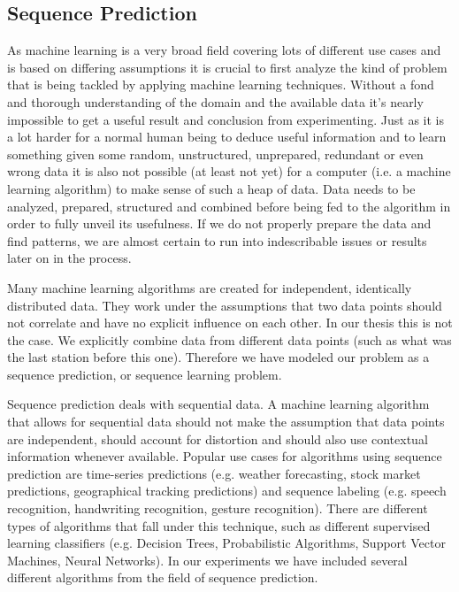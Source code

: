 \subsection{Sequence Prediction}
As machine learning is a very broad field covering lots of different use cases and is based on differing assumptions it is crucial to first analyze the kind of problem that is being tackled by applying machine learning techniques. Without a fond and thorough understanding of the domain and the available data it's nearly impossible to get a useful result and conclusion from experimenting. Just as it is a lot harder for a normal human being to deduce useful information and to learn something given some random, unstructured, unprepared, redundant or even wrong data it is also not possible (at least not yet) for a computer (i.e. a machine learning algorithm) to make sense of such a heap of data. Data needs to be analyzed, prepared, structured and combined before being fed to the algorithm in order to fully unveil its usefulness. If we do not properly prepare the data and find patterns, we are almost certain to run into indescribable issues or results later on in the process. \cite{DataMining} 

Many machine learning algorithms are created for independent, identically distributed data.\cite{MachineLearningTUMunich} They work under the assumptions that two data points should not correlate and have no explicit influence on each other. In our thesis this is not the case. We explicitly combine data from different data points (such as what was the last station before this one). Therefore we have modeled our problem as a sequence prediction, or sequence learning problem.

Sequence prediction deals with sequential data. A machine learning algorithm that allows for sequential data should not make the assumption that data points are independent, should account for distortion and should also use contextual information whenever available. Popular use cases for algorithms using sequence prediction are time-series predictions (e.g. weather forecasting, stock market predictions, geographical tracking predictions) and sequence labeling (e.g. speech recognition, handwriting recognition, gesture recognition). There are different types of algorithms that fall under this technique, such as different supervised learning classifiers (e.g. Decision Trees, Probabilistic Algorithms, Support Vector Machines, Neural Networks). In our experiments we have included several different algorithms from the field of sequence prediction.

